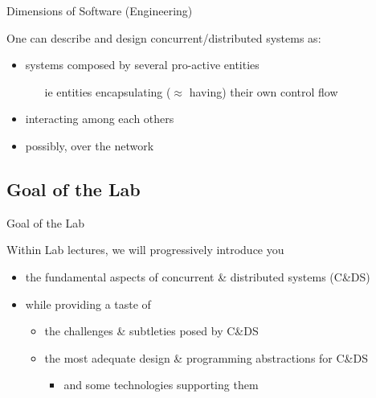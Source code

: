 \documentclass[presentation]{beamer}\mode<presentation>{\usetheme{AMSBolognaFC}}
\begin{document}
\begin{frame}[c,allowframebreaks]{Dimensions of Software (Engineering)}
    \bigskip

    One can describe and design concurrent/distributed systems as:
    \begin{itemize}
        \item systems composed by several \alert{pro-active} entities
        \begin{itemize}
            \item[ie] entities \alert{encapsulating} ($\approx$ having) their own \alert{control flow}
        \end{itemize}
        \item \alert{interacting} among each others
        \item possibly, over the \alert{network}
    \end{itemize}

\end{frame}

\subsection{Goal of the Lab}

\begin{frame}[c]{Goal of the Lab}

    Within Lab lectures, we will progressively introduce you
    \vfill
    \begin{itemize}
        \item the fundamental aspects of concurrent \& distributed systems (C\&DS)

        \vfill

        \item while providing a taste of
        \begin{itemize}
            \item the challenges \& subtleties posed by C\&DS
            \item the most adequate design \& programming abstractions for C\&DS
            \begin{itemize}
                \item and some technologies supporting them
            \end{itemize}
        \end{itemize}

    \end{itemize}

\end{frame}
\end{document}
